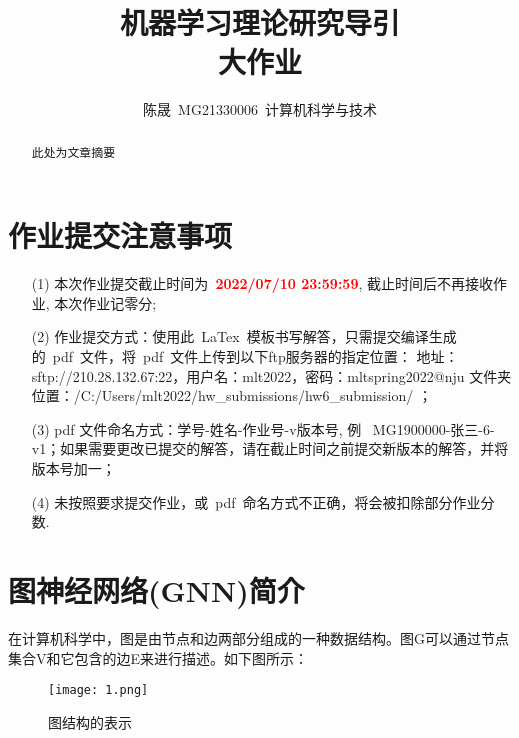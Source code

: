 \documentclass[a4paper,UTF8]{article}
\numberwithin{equation}{section}
\begin{document}
	\title{机器学习理论研究导引\\
		大作业}
	\author{陈晟\, MG21330006\, 计算机科学与技术} 
	\date{}
	\maketitle
	
	\section*{作业提交注意事项}
	\begin{tcolorbox}
		\begin{enumerate}
			\item[(1)] 本次作业提交截止时间为~\textcolor{red}{\textbf{2022/07/10  23:59:59}}, 截止时间后不再接收作业, 本次作业记零分; 
			\item[(2)] 作业提交方式：使用此~LaTex~模板书写解答，只需提交编译生成的~pdf~文件，将~pdf~文件上传到以下ftp服务器的指定位置：
			\newline 地址：sftp://210.28.132.67:22，用户名：mlt2022，密码：mltspring2022@nju
			\newline 文件夹位置：/C:/Users/mlt2022/hw\_submissions/hw6\_submission/  ；
			\item[(3)] pdf 文件命名方式：学号-姓名-作业号-v版本号, 例~ MG1900000-张三-6-v1；如果需要更改已提交的解答，请在截止时间之前提交新版本的解答，并将版本号加一；
			\item[(4)] 未按照要求提交作业，或~pdf~命名方式不正确，将会被扣除部分作业分数. 
		\end{enumerate}
	\end{tcolorbox}
	
	\begin{abstract}
		
		此处为文章摘要
		
	\end{abstract}
	
	
	\newpage
	\section{图神经网络(GNN)简介}
	在计算机科学中，图是由节点和边两部分组成的一种数据结构。图G可以通过节点集合V和它包含的边E来进行描述。如下图所示：
	
	\begin{figure}[ht]
		\centering
		\texttt{[image: 1.png]}
		\caption{图结构的表示}
		\label{fig:label}
	\end{figure}
	
\end{document}
